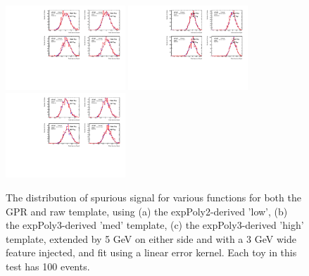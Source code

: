 \begin{figure} 
\begin{center}
  \includegraphics[width=0.4\textwidth]{figures/background/gpr/validation/linear/ToyTest_FitSigVals_lowpT_100_Sig}   
  \includegraphics[width=0.4\textwidth]{figures/background/gpr/validation/linear/ToyTest_FitSigVals_medpT_100_Sig}   
  \includegraphics[width=0.4\textwidth]{figures/background/gpr/validation/linear/ToyTest_FitSigVals_highpT_100_Sig}   
\caption{The distribution of spurious signal for various functions for both the GPR and raw template, using (a) the expPoly2-derived 'low', (b) the expPoly3-derived 'med' template, (c) the expPoly3-derived 'high' template, extended by 5 GeV on either side and with a 3 GeV wide feature injected, and fit using a linear error kernel. Each toy in this test has 100 events.}
\label{fig:linearkernel_lowpt_100_Sig}
\end{center}
\end{figure}

